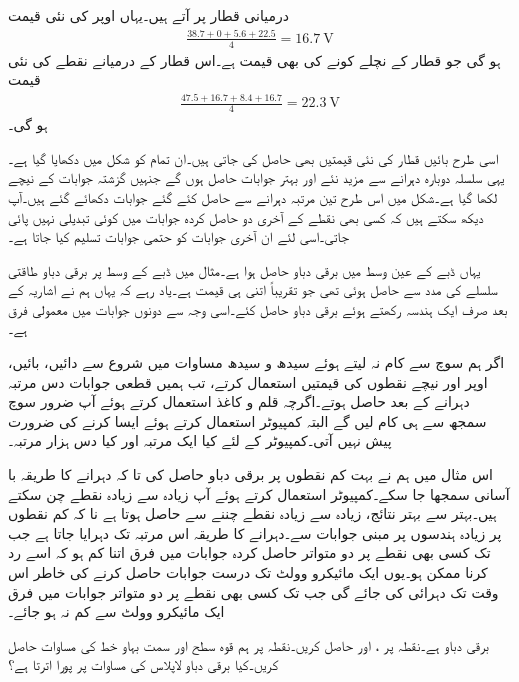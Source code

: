 درمیانی قطار پر آتے ہیں۔یہاں اوپر  کی نئی قیمت
\begin{align*}
\frac{38.7+0+5.6+22.5}{4}=\SI{16.7}{\volt}
\end{align*}
ہو گی جو قطار کے  نچلے کونے کی بھی قیمت ہے۔اس قطار کے درمیانے نقطے کی نئی قیمت
\begin{align*}
\frac{47.5+16.7+8.4+16.7}{4}=\SI{22.3}{\volt}
\end{align*}
ہو گی۔

اسی طرح بائیں قطار  کی نئی قیمتیں بھی حاصل کی جاتی ہیں۔ان تمام کو شکل  میں دکھایا گیا ہے۔یہی سلسلہ دوبارہ دہرانے سے مزید نئے اور بہتر جوابات حاصل ہوں گے جنہیں گزشتہ جوابات کے نیچے لکھا گیا ہے۔شکل میں اس طرح تین مرتبہ دہرانے سے حاصل کئے گئے جوابات دکھائے گئے ہیں۔آپ دیکھ سکتے ہیں کہ کسی بھی نقطے کے آخری دو حاصل کردہ جوابات میں کوئی تبدیلی نہیں پائی جاتی۔اسی لئے ان آخری جوابات کو حتمی جوابات تسلیم کیا جاتا ہے۔

یہاں ڈبے کے عین وسط میں برقی دباو  حاصل ہوا ہے۔مثال  میں ڈبے کے وسط پر برقی دباو طاقتی سلسلے کی مدد سے  حاصل ہوئی تھی جو تقریباً اتنی ہی قیمت ہے۔یاد رہے کہ یہاں ہم نے اشاریہ کے بعد صرف ایک ہندسہ رکھتے ہوئے برقی دباو حاصل کئے۔اسی وجہ سے دونوں جوابات میں معمولی فرق ہے۔ 

اگر ہم سوچ سے کام نہ لیتے ہوئے سیدھ و سیدھ مساوات  میں شروع سے دائیں، بائیں، اوپر اور نیچے نقطوں کی قیمتیں استعمال کرتے، تب ہمیں قطعی جوابات دس مرتبہ دہرانے کے بعد حاصل ہوتے۔اگرچہ قلم و کاغذ استعمال کرتے ہوئے آپ ضرور سوچ سمجھ سے ہی کام لیں گے البتہ کمپیوٹر استعمال کرتے ہوئے ایسا کرنے کی ضرورت پیش نہیں آتی۔کمپیوٹر کے لئے کیا ایک مرتبہ اور کیا دس ہزار مرتبہ۔

اس مثال میں ہم نے بہت کم نقطوں پر برقی دباو حاصل کی تا کہ دہرانے کا طریقہ با آسانی سمجھا جا سکے۔کمپیوٹر استعمال کرتے ہوئے آپ زیادہ سے زیادہ نقطے چن سکتے ہیں۔بہتر سے بہتر نتائج، زیادہ سے زیادہ نقطے چننے سے حاصل ہوتا ہے نا کہ کم نقطوں پر زیادہ ہندسوں پر مبنی جوابات سے۔دہرانے کا طریقہ اس مرتبہ تک دہرایا جاتا ہے جب تک کسی بھی نقطے پر دو متواتر حاصل کردہ جوابات میں فرق اتنا کم ہو کہ اسے رد کرنا ممکن ہو۔یوں ایک مائیکرو وولٹ تک درست جوابات حاصل کرنے کی خاطر اس وقت تک دہرائی کی جائے گی جب تک کسی بھی نقطے پر دو متواتر جوابات میں فرق ایک مائیکرو وولٹ سے کم نہ ہو جائے۔    

\newpage

برقی دباو  ہے۔نقطہ  پر ،  اور  حاصل کریں۔نقطہ  پر ہم قوہ سطح اور سمت بہاو خط کی مساوات حاصل کریں۔کیا برقی دباو لاپلاس کی مساوات پر پورا اترتا ہے؟

